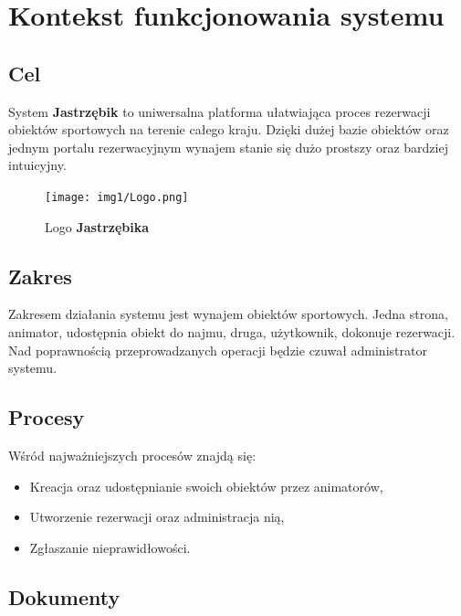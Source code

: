 \documentclass[a4paper,11pt]{article}
\begin{document}
\section{Kontekst funkcjonowania systemu}

    \subsection{Cel} 

        System \textbf{Jastrzębik} to uniwersalna platforma ułatwiająca proces rezerwacji obiektów sportowych na terenie całego kraju. Dzięki dużej bazie obiektów oraz jednym portalu rezerwacyjnym wynajem stanie się dużo prostszy oraz bardziej intuicyjny.
    
        \begin{figure}[H] 
        	\begin{center}
        		\texttt{[image: img1/Logo.png]}
                \caption{Logo \textbf{Jastrzębika}}
        	\end{center}
        \end{figure}

    \subsection{Zakres}
    
        Zakresem działania systemu jest wynajem obiektów sportowych. Jedna strona, animator, udostępnia obiekt do najmu, druga, użytkownik, dokonuje rezerwacji. Nad poprawnością przeprowadzanych operacji będzie czuwał administrator systemu.

    \subsection{Procesy}
        Wśród najważniejszych procesów znajdą się:
    
        \begin{itemize}
            \item Kreacja oraz udostępnianie swoich obiektów przez animatorów,
            \item Utworzenie rezerwacji oraz administracja nią,
            \item Zgłaszanie nieprawidłowości.
        \end{itemize}

    \subsection{Dokumenty}    
    
\end{document}
